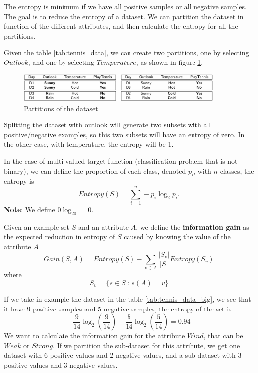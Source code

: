 \documentclass[10pt, letterpaper]{report}
\begin{document}
The entropy is minimum if we have all positive samples or all negative samples. The goal is to reduce the entropy of a dataset. We can partition the dataset in function of the different attributes, and then calculate the entropy for all the partitions. \bigskip

Given the table \ref{tab:tennis_data}, we can create two partitions, one by selecting $Outlook$, and one by selecting $Temperature$, as shown in figure \ref{img:partitions}.

\begin{figure}[h!]
	\centering
	\includegraphics[width=0.9\textwidth]{images/partitions.png}
	\caption{Partitions of the dataset}
	\label{img:partitions}
\end{figure}

Splitting the dataset with outlook will generate two subsets with all positive/negative examples, so this two subsets will have an entropy of zero. In the other case, with temperature, the entropy will be 1.\bigskip

\noindent In the case of multi-valued target function (classification problem that is not binary), we can define the proportion of each class, denoted $p_i$, with $n$ classes, the entropy is\begin{equation}
	Entropy(S)=\sum_{i=1}^n-p_i\log_2p_i.
\end{equation}
\textbf{Note}: We define $0\log_20=0$.
\begin{definition}
	Given an example set $S$ and an attribute $A$, we define the \textbf{information gain} as the expected reduction in entropy of $S$ caused by knowing the value of the attribute $A$\begin{equation}
		Gain(S,A)=Entropy(S)-\sum_{v\in A}\frac{|S_v|}{|S|}Entropy(S_v)
	\end{equation}
	where\begin{equation}
		S_v=\{s\in S \ : \ s(A)=v\}
	\end{equation}
\end{definition}

If we take in example the dataset in the table \ref{tab:tennis_data_big}, we see that it have 9 positive samples and 5 negative samples, the entropy of the set is \begin{equation}
	-\frac{9}{14}\log_2\left(\frac{9}{14}\right)-\frac{5}{14}\log_2\left(\frac{5}{14}\right)=0.94
\end{equation}
We want to calculate the information gain for the attribute $Wind$, that can be $Weak$ or $Strong$. If we partition the sub-dataset for this attribute, we get one dataset with 6 positive values and 2 negative values, and a sub-dataset with 3 positive values and 3 negative values.
\end{document}
